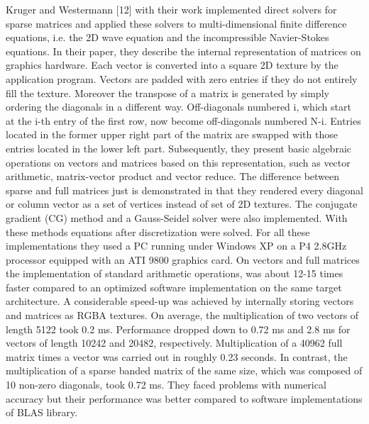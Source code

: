 Kruger and Westermann [12] with their work implemented direct solvers for sparse matrices and applied these solvers to multi-dimensional finite difference equations, i.e. the 2D wave equation and the incompressible Navier-Stokes equations. In their paper, they describe the internal representation of matrices on graphics hardware. Each vector is converted into a square 2D texture by the application program. Vectors are padded with zero entries if they do not entirely fill the texture. Moreover the transpose of a matrix is generated by simply ordering the diagonals in a different way. Off-diagonals numbered i, which start at the i-th entry of the first row, now become off-diagonals numbered N-i. Entries located in the former upper right part of the matrix are swapped with those entries located in the lower left part. Subsequently, they present basic algebraic operations on vectors and matrices based on this representation, such as vector arithmetic, matrix-vector product and vector reduce. The difference between sparse and full matrices just is demonstrated in that they rendered every diagonal or column vector as a set of vertices instead of set of 2D textures. The conjugate gradient (CG) method and a Gauss-Seidel solver were also implemented. With these methods equations after discretization were solved. For all these implementations they used a PC running under Windows XP on a P4 2.8GHz processor equipped with an ATI 9800 graphics card.  On vectors and full matrices the implementation of standard arithmetic operations, was about 12-15 times faster compared to an optimized software implementation on the same target architecture. A considerable speed-up was achieved by internally storing vectors and matrices as RGBA textures. On average, the multiplication of two vectors of length 5122 took 0.2 ms. Performance dropped down to 0.72 ms and 2.8 ms for vectors of length 10242 and 20482, respectively. Multiplication of a 40962 full matrix times a vector was carried out in roughly 0.23 seconds. In contrast, the multiplication of a sparse banded matrix of the same size, which was composed of 10 non-zero diagonals, took 0.72 ms. They faced problems with numerical accuracy but their performance was better compared to software implementations of BLAS library.


